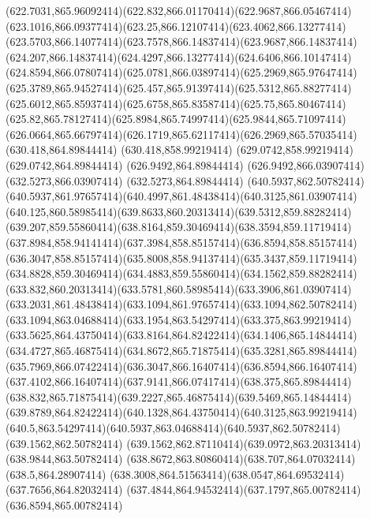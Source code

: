 {{	\curveto(622.7031,865.96092414)(622.832,866.01170414)(622.9687,866.05467414)
	\curveto(623.1016,866.09377414)(623.25,866.12107414)(623.4062,866.13277414)
	\curveto(623.5703,866.14077414)(623.7578,866.14837414)(623.9687,866.14837414)
	\curveto(624.207,866.14837414)(624.4297,866.13277414)(624.6406,866.10147414)
	\curveto(624.8594,866.07807414)(625.0781,866.03897414)(625.2969,865.97647414)
	\curveto(625.3789,865.94527414)(625.457,865.91397414)(625.5312,865.88277414)
	\curveto(625.6012,865.85937414)(625.6758,865.83587414)(625.75,865.80467414)
	\curveto(625.82,865.78127414)(625.8984,865.74997414)(625.9844,865.71097414)
	\curveto(626.0664,865.66797414)(626.1719,865.62117414)(626.2969,865.57035414)
	\closepath
	\moveto(630.418,864.89844414)
	\lineto(630.418,858.99219414)
	\lineto(629.0742,858.99219414)
	\lineto(629.0742,864.89844414)
	\lineto(626.9492,864.89844414)
	\lineto(626.9492,866.03907414)
	\lineto(632.5273,866.03907414)
	\lineto(632.5273,864.89844414)
	\closepath
	\moveto(640.5937,862.50782414)
	\curveto(640.5937,861.97657414)(640.4997,861.48438414)(640.3125,861.03907414)
	\curveto(640.125,860.58985414)(639.8633,860.20313414)(639.5312,859.88282414)
	\curveto(639.207,859.55860414)(638.8164,859.30469414)(638.3594,859.11719414)
	\curveto(637.8984,858.94141414)(637.3984,858.85157414)(636.8594,858.85157414)
	\curveto(636.3047,858.85157414)(635.8008,858.94137414)(635.3437,859.11719414)
	\curveto(634.8828,859.30469414)(634.4883,859.55860414)(634.1562,859.88282414)
	\curveto(633.832,860.20313414)(633.5781,860.58985414)(633.3906,861.03907414)
	\curveto(633.2031,861.48438414)(633.1094,861.97657414)(633.1094,862.50782414)
	\curveto(633.1094,863.04688414)(633.1954,863.54297414)(633.375,863.99219414)
	\curveto(633.5625,864.43750414)(633.8164,864.82422414)(634.1406,865.14844414)
	\curveto(634.4727,865.46875414)(634.8672,865.71875414)(635.3281,865.89844414)
	\curveto(635.7969,866.07422414)(636.3047,866.16407414)(636.8594,866.16407414)
	\curveto(637.4102,866.16407414)(637.9141,866.07417414)(638.375,865.89844414)
	\curveto(638.832,865.71875414)(639.2227,865.46875414)(639.5469,865.14844414)
	\curveto(639.8789,864.82422414)(640.1328,864.43750414)(640.3125,863.99219414)
	\curveto(640.5,863.54297414)(640.5937,863.04688414)(640.5937,862.50782414)
	\closepath
	\moveto(639.1562,862.50782414)
	\curveto(639.1562,862.87110414)(639.0972,863.20313414)(638.9844,863.50782414)
	\curveto(638.8672,863.80860414)(638.707,864.07032414)(638.5,864.28907414)
	\curveto(638.3008,864.51563414)(638.0547,864.69532414)(637.7656,864.82032414)
	\curveto(637.4844,864.94532414)(637.1797,865.00782414)(636.8594,865.00782414)
}}
